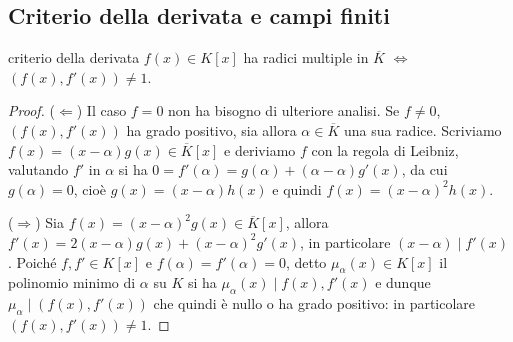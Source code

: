 \subsection{Criterio della derivata e campi finiti}

\begin{proposition}{criterio della derivata}
    $f(x) \in K[x]$ ha radici multiple in $\overline{K}$ $\Leftrightarrow$ $(f(x),f'(x)) \neq 1$.
\end{proposition}
\begin{proof}
    ($\Leftarrow$) Il caso $f = 0$ non ha bisogno di ulteriore analisi. Se $f \neq 0$, $(f(x), f'(x))$ ha grado positivo, sia allora $\alpha \in \overline{K}$ una sua radice. Scriviamo $f(x) = (x - \alpha)g(x) \in \overline{K}[x]$ e deriviamo $f$ con la regola di Leibniz, valutando $f'$ in $\alpha$ si ha $0 = f'(\alpha) = g(\alpha) + (\alpha - \alpha)g'(x)$, da cui $g(\alpha) = 0$, cioè $g(x) = (x - \alpha)h(x)$ e quindi $f(x) = (x - \alpha)^2 h(x)$.
    
    ($\Rightarrow$) Sia $f(x) = (x - \alpha)^2g(x) \in \overline{K}[x]$, allora $f'(x) = 2(x - \alpha)g(x) + (x - \alpha)^2g'(x)$, in particolare $(x - \alpha) \mid f'(x)$. Poiché $f,f' \in K[x]$ e $f(\alpha) = f'(\alpha) = 0$, detto $\mu_\alpha(x) \in K[x]$ il polinomio minimo di $\alpha$ su $K$ si ha $\mu_\alpha(x) \mid f(x), f'(x)$ e dunque $\mu_\alpha \mid (f(x), f'(x))$ che quindi è nullo o ha grado positivo: in particolare $(f(x), f'(x)) \neq 1$.
\end{proof}

